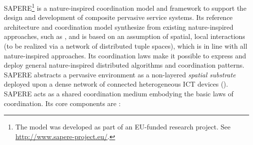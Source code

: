 \documentclass[12pt,a4paper,twoside,openright]{book}
\begin{document}
SAPERE\footnote{The model was developed as part of an EU-funded research project. See \url{http://www.sapere-project.eu/}.} \cite{sapere-procedia7} is a nature-inspired coordination model and framework to support the design and development of composite pervasive service systems.
%
Its reference architecture and coordination model synthesize from existing nature-inspired approaches, such as \cite{biochemicalTupleSpaces, frameworkSelfOrg, VCMZ-TAAS2011, wordNet}, and is based on an assumption of spatial, local interactions (to be realized via a network of distributed tuple spaces), which is in line with all nature-inspired approaches.
%
Its coordination laws make it possible to express and deploy general nature-inspired distributed algorithms and coordination patterns.
%
SAPERE abstracts a pervasive environment as a non-layered \emph{spatial substrate} deployed upon a dense network of connected heterogeneous ICT devices ().
%
SAPERE acts as a shared coordination medium embodying the basic laws of coordination.
%
Its core components are \cite{sapereecolaws-sac2012}:
\end{document}
